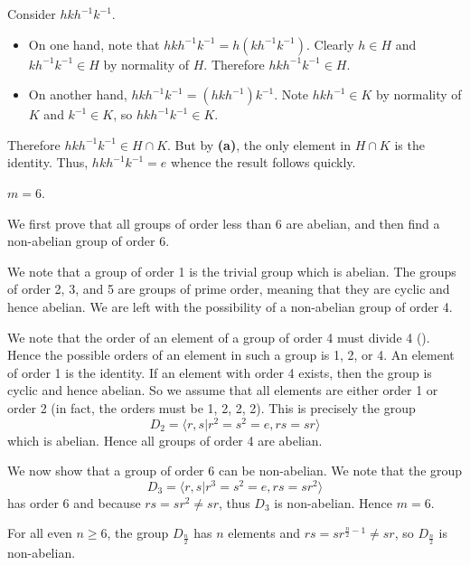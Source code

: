 \begin{questions}
\begin{partquestions}{\alph*}
        \item Consider $hkh^{-1}k^{-1}$.
        \begin{itemize}
            \item On one hand, note that $hkh^{-1}k^{-1} = h(kh^{-1}k^{-1})$. Clearly $h \in H$ and $kh^{-1}k^{-1} \in H$ by normality of $H$. Therefore $hkh^{-1}k^{-1} \in H$.
            \item On another hand, $hkh^{-1}k^{-1} = (hkh^{-1})k^{-1}$. Note $hkh^{-1} \in K$ by normality of $K$ and $k^{-1} \in K$, so $hkh^{-1}k^{-1} \in K$.
        \end{itemize}
        Therefore $hkh^{-1}k^{-1} \in H \cap K$. But by \textbf{(a)}, the only element in $H \cap K$ is the identity. Thus, $hkh^{-1}k^{-1} = e$ whence the result follows quickly.
    \end{partquestions}

    \item \begin{partquestions}{\alph*}
        \item $m = 6$.
        \item We first prove that all groups of order less than 6 are abelian, and then find a non-abelian group of order 6.

        We note that a group of order 1 is the trivial group which is abelian. The groups of order 2, 3, and 5 are groups of prime order, meaning that they are cyclic and hence abelian. We are left with the possibility of a non-abelian group of order 4.

        We note that the order of an element of a group of order 4 must divide 4 (). Hence the possible orders of an element in such a group is 1, 2, or 4. An element of order 1 is the identity. If an element with order 4 exists, then the group is cyclic and hence abelian. So we assume that all elements are either order 1 or order 2 (in fact, the orders must be 1, 2, 2, 2). This is precisely the group
        \[
            D_2 = \langle r, s \vert r^2 = s^2 = e, rs = sr\rangle
        \]
        which is abelian. Hence all groups of order 4 are abelian.

        We now show that a group of order 6 can be non-abelian. We note that the group
        \[
            D_3 =  \langle r, s \vert r^3 = s^2 = e, rs = sr^2\rangle
        \]
        has order 6 and because $rs = sr^2 \neq sr$, thus $D_3$ is non-abelian. Hence $m = 6$.

        \item For all even $n \geq 6$, the group $D_{\frac n2}$ has $n$ elements and $rs = sr^{\frac n2 - 1} \neq sr$, so $D_{\frac n2}$ is non-abelian.
    \end{partquestions}


\end{questions}
